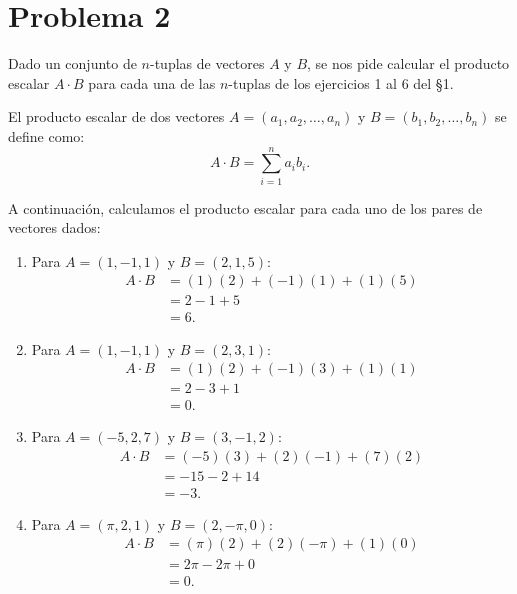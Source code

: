 \section*{Problema 2}

Dado un conjunto de $n$-tuplas de vectores $A$ y $B$, se nos pide calcular el producto escalar $A \cdot B$ para cada una de las $n$-tuplas de los ejercicios 1 al 6 del \S 1.

El producto escalar de dos vectores $A = (a_1, a_2, \dots, a_n)$ y $B = (b_1, b_2, \dots, b_n)$ se define como:
\[
A \cdot B = \sum_{i=1}^n a_i b_i.
\]

A continuación, calculamos el producto escalar para cada uno de los pares de vectores dados:

\begin{enumerate}
    \item Para $A = (1, -1, 1)$ y $B = (2, 1, 5)$:
    \begin{align*}
        A \cdot B &= (1)(2) + (-1)(1) + (1)(5) \\
        &= 2 - 1 + 5 \\
        &= 6.
    \end{align*}

    \item Para $A = (1, -1, 1)$ y $B = (2, 3, 1)$:
    \begin{align*}
        A \cdot B &= (1)(2) + (-1)(3) + (1)(1) \\
        &= 2 - 3 + 1 \\
        &= 0.
    \end{align*}

    \item Para $A = (-5, 2, 7)$ y $B = (3, -1, 2)$:
    \begin{align*}
        A \cdot B &= (-5)(3) + (2)(-1) + (7)(2) \\
        &= -15 - 2 + 14 \\
        &= -3.
    \end{align*}

    \item Para $A = (\pi, 2, 1)$ y $B = (2, -\pi, 0)$:
    \begin{align*}
        A \cdot B &= (\pi)(2) + (2)(-\pi) + (1)(0) \\
        &= 2\pi - 2\pi + 0 \\
        &= 0.
    \end{align*}
\end{enumerate}